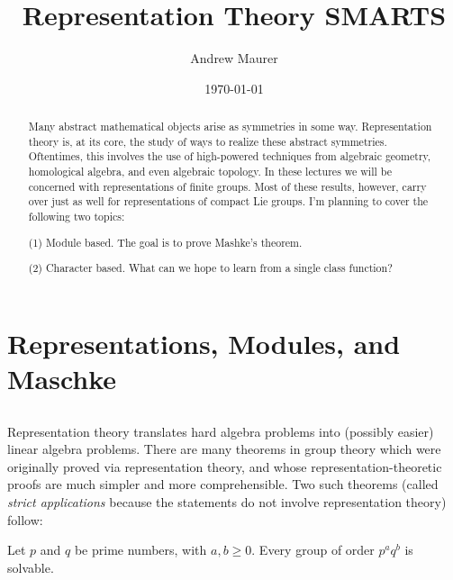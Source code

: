 \documentclass[twoside,11pt,reqno]{amsart}
\begin{document}
\title{Representation Theory SMARTS}
\author{Andrew Maurer}
\address{Department of Mathematics\\University of Georgia\\Athens, GA 30602}
\date{\today}

\maketitle

\begin{abstract}
  Many abstract mathematical objects arise as symmetries in some way. Representation theory is, at its core, the study of ways to realize these abstract symmetries. Oftentimes, this involves the use of high-powered techniques from algebraic geometry, homological algebra, and even algebraic topology. In these lectures we will be concerned with representations of finite groups. Most of these results, however, carry over just as well for representations of compact Lie groups. I'm planning to cover the following two topics:

  (1) Module based. The goal is to prove Mashke's theorem.

  (2) Character based. What can we hope to learn from a single class function?
\end{abstract}

\section{Representations, Modules, and Maschke}
\label{sec:intro}

\subsection{}

Representation theory translates hard algebra problems into (possibly easier) linear algebra problems. There are many theorems in group theory which were originally proved via representation theory, and whose representation-theoretic proofs are much simpler and more comprehensible. Two such theorems (called \emph{strict applications} because the statements do not involve representation theory) follow:
\begin{theorem}
  Let $p$ and $q$ be prime numbers, with $a,b \geq 0$. Every group of order $p^a q^b$ is solvable.
\end{theorem}

\begin{theorem}
  
\end{theorem}
\end{document}
